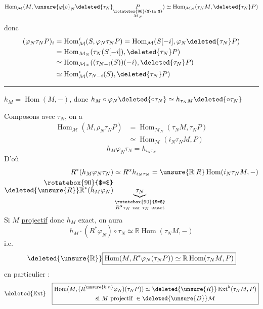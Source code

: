 \[
\operatorname{Hom}_{\mathcal M}(M,\unsure{\varphi|\rho}_N\deleted{\tau_N}\underset{\substack{\rotatebox{90}{$\in$}\\\mathcal M_N}}{P})\simeq
\operatorname{Hom}_{\mathcal M_N}(\tau_N M,\deleted{\tau_N}P)
\]
donc
\[
\begin{aligned}
(\varphi_N\tau_N P)_i&=\operatorname{Hom}_{\mathcal M}^i(S,\varphi_N\tau_N P)=\operatorname{Hom}_{\mathcal M}(S[-i],\varphi_N\deleted{\tau_N}P)\\
&=\operatorname{Hom}_{\mathcal M_N}(\tau_N(S[-i]),\deleted{\tau_N}P)\\
&\simeq\operatorname{Hom}_{\mathcal M_N}((\tau_{N-i}(S))(-i),\deleted{\tau_N}P)\\
&\simeq\operatorname{Hom}_{\mathcal M}^i(\tau_{N-i}(S),\deleted{\tau_N}P)
\end{aligned}
\]

\noindent\rule{.91\linewidth}{.3pt}\par
$h_M=\operatorname{Hom}(M,-)$, donc $h_M\circ\varphi_N\deleted{\circ\tau_N}\simeq h_{\tau_N M}\deleted{\circ\tau_N}$



Composons avec $\tau_N$, on a
\[
\begin{aligned}
\operatorname{Hom}_{\mathcal M}(M,\rho_N\tau_N P)&=\operatorname{Hom}_{\mathcal M_N}(\tau_N M,\tau_N P)\\
&\simeq\operatorname{Hom}_{\mathcal M}(i_N\tau_N M,P)
\end{aligned}
\]
\[
h_M\varphi_N\tau_N=h_{i_N\tau_N}
\]
D'où
\[
\begin{aligned}
R^*(h_M\varphi_N\tau_N)&\simeq R^{\alpha}h_{i_N\tau_N}=\unsure{\mathbb R|R}\operatorname{Hom}(i_N\tau_N M,-)\\
\rotatebox{90}{$=$}&\\[-1ex]
\deleted{\unsure{R}}\mathbb R^*(h_M\varphi_N)&\underbrace{\tau_N}_{\substack{\rotatebox{90}{$=$}\\R^\alpha\tau_N\ \text{car }\tau_N\ \text{exact}}}
\end{aligned}
\]
Si $M$ \uline{projectif} donc $h_M$ exact, on aura
\[
h_M\cdot(R^*\varphi_N)\circ\tau_N\simeq\mathbb R\operatorname{Hom}(\tau_N M,-)
\]
i.e.
\[
\deleted{\unsure{\mathbb R}}\boxed{\operatorname{Hom}(M,R^*\varphi_N(\tau_N P))\simeq\mathbb R\operatorname{Hom}(\tau_N M,P)}
\]
en particulier :
\[
\deleted{\operatorname{Ext}}\quad
\boxed{\begin{gathered}
\operatorname{Hom}(M,(R^{\unsure{k|n}}\varphi_N)(\tau_N P))\simeq\deleted{\unsure{R}}\operatorname{Ext}^{k}(\tau_N M,P)\\
\text{si } M\ \text{projectif }\in\deleted{\unsure{D}}\mathcal M
\end{gathered}}
\]
